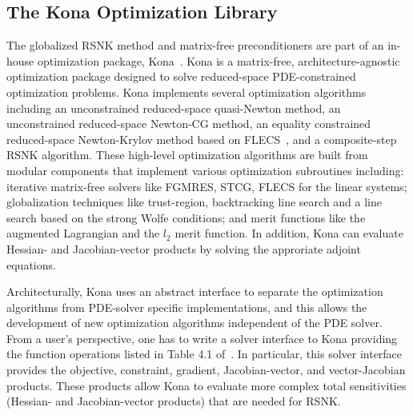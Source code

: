 \subsection{The Kona Optimization Library}\label{sec:kona_mv}
The globalized RSNK method and matrix-free preconditioners are part of 
an in-house optimization package, Kona~\cite{dener:scitech2016}. Kona is a matrix-free, 
architecture-agnostic optimization package designed to solve reduced-space PDE-constrained 
optimization problems.  Kona implements several optimization 
algorithms including an unconstrained 
reduced-space quasi-Newton method, an unconstrained reduced-space 
Newton-CG method, an equality constrained reduced-space Newton-Krylov method 
based on FLECS~\cite{hicken:flecs2014}, and a composite-step RSNK algorithm.
These high-level optimization algorithms are built from modular components that implement various optimization subroutines including:
iterative matrix-free solvers like FGMRES, STCG, FLECS for the linear systems; 
globalization techniques like trust-region, backtracking line search and a line search based on 
the strong Wolfe conditions;   and merit functions like the augmented Lagrangian and the $l_2$ 
merit function.  In addition, Kona can evaluate Hessian- and Jacobian-vector products by solving the approriate adjoint equations. 

Architecturally, Kona uses an abstract interface to separate the optimization algorithms from PDE-solver specific implementations, and this allows the development of new optimization algorithms independent of the PDE solver. 
 From a user's perspective, one has to write a solver interface to Kona providing 
the function operations listed in Table 4.1 of~\cite{dener_thesis_2017}. In particular, this solver interface 
provides the objective, constraint, gradient, Jacobian-vector, and vector-Jacobian products.
These products allow Kona to evaluate more complex total sensitivities (\eg Hessian- and Jacobian-vector products)
that are needed for RSNK.





